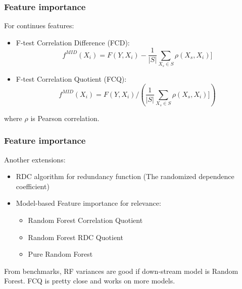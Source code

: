 \documentclass{beamer}
\begin{document}
    \begin{frame}
        \frametitle{Feature importance}
        For continues features:
        \begin{itemize}
            \item F-test Correlation Difference (FCD):
            \[
                f^{MID}(X_i) = F(Y, X_i) - \frac{1}{|S|} \sum_{X_s \in S} \rho (X_s, X_i)]
            \]
            \pause
            \item F-test Correlation Quotient (FCQ):
            \[
                f^{MID}(X_i) = F(Y, X_i) / \left( \frac{1}{|S|} \sum_{X_s \in S} \rho (X_s, X_i)] \right)
            \]
        \end{itemize}
        where $\rho$ is Pearson correlation.
    \end{frame}

    \begin{frame}
        \frametitle{Feature importance}
        Another extensions:
        \begin{itemize}
            \item RDC algorithm for redundancy function (The randomized dependence coefficient)
            \pause
            \item Model-based Feature importance for relevance:
                \begin{itemize}
                    \item Random Forest Correlation Quotient
                    \item Random Forest RDC Quotient
                    \item Pure Random Forest
                \end{itemize}
        \end{itemize}
        \pause
        From benchmarks, RF variances are good if down-stream model is Random Forest. FCQ is
        pretty close and works on more models.
    \end{frame}
\end{document}
